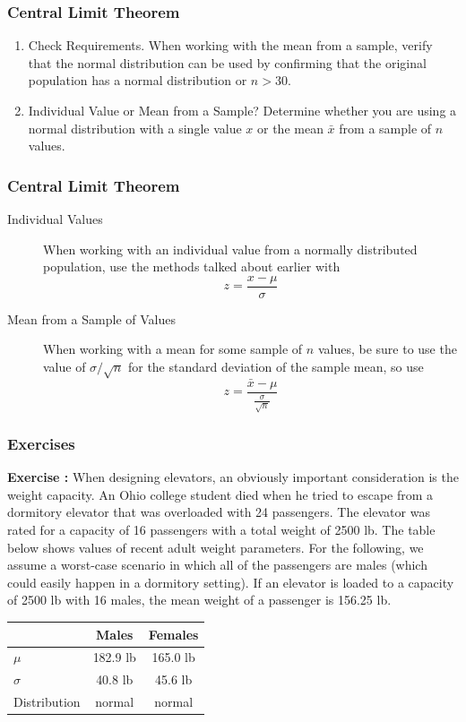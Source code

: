 \documentclass[xcolor=dvipsnames]{beamer}
\newcounter{exercise}
\newcommand{\ubung}[0]{\refstepcounter{exercise}\textbf{Exercise \arabic{exercise}: }}
\begin{document}
\begin{frame}
  \frametitle{Central Limit Theorem}
\begin{enumerate}
\item Check Requirements. When working with the mean from a sample,
  verify that the normal distribution can be used by confirming that
  the original population has a normal distribution or $n>30$. 
\item Individual Value or Mean from a Sample? Determine whether you
  are using a normal distribution with a single value $x$ or the mean
  $\bar{x}$ from a sample of $n$ values. 
\end{enumerate}
\end{frame}

\begin{frame}
  \frametitle{Central Limit Theorem}
\begin{description}
\item[Individual Values] When working with an individual value from a
  normally distributed population, use the methods talked about
  earlier with 
  \begin{equation}
    \label{eq:cohseiph}
    z=\frac{x-\mu}{\sigma}
  \end{equation}
\item[Mean from a Sample of Values] When working with a mean for some
  sample of $n$ values, be sure to use the value of $\sigma/\sqrt{n}$
  for the standard deviation of the sample mean, so use
  \begin{equation}
    \label{eq:euruighu}
    z=\frac{\bar{x}-\mu}{\frac{\sigma}{\sqrt{n}}}
  \end{equation}
\end{description}
\end{frame}

\begin{frame}
  \frametitle{Exercises} 
  {\ubung} When designing elevators, an obviously important
  consideration is the weight capacity. An Ohio college student died
  when he tried to escape from a dormitory elevator that was
  overloaded with 24 passengers. The elevator was rated for a capacity
  of 16 passengers with a total weight of 2500 lb. The table below
  shows values of recent adult weight parameters. For the following,
  we assume a worst-case scenario in which all of the passengers are
  males (which could easily happen in a dormitory setting). If an
  elevator is loaded to a capacity of 2500 lb with 16 males, the mean
  weight of a passenger is 156.25 lb.

\medskip

  \begin{tabular}{|l|c|c|}\hline
    & Males & Females \\ \hline
    $\mu$ & 182.9 lb & 165.0 lb \\ \hline
    $\sigma$ & 40.8 lb & 45.6 lb \\ \hline 
    Distribution & normal & normal \\ \hline
  \end{tabular}
\end{frame}
\end{document}
